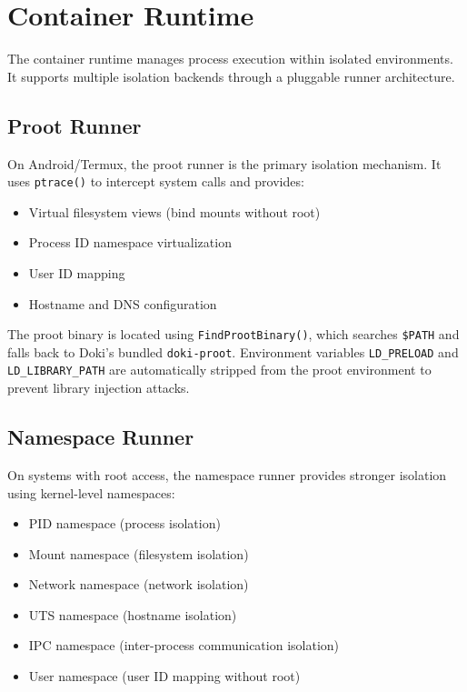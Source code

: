 \section{Container Runtime}
\label{sec:container-runtime}

The container runtime manages process execution within isolated
environments. It supports multiple isolation backends through a
pluggable runner architecture.

\subsection{Proot Runner}
\label{sec:proot-runner}

On Android/Termux, the proot runner is the primary isolation mechanism.
It uses \texttt{ptrace()} to intercept system calls and provides:

\begin{itemize}[leftmargin=*, itemsep=3pt]
  \item Virtual filesystem views (bind mounts without root)
  \item Process ID namespace virtualization
  \item User ID mapping
  \item Hostname and DNS configuration
\end{itemize}

The proot binary is located using \texttt{FindProotBinary()}, which
searches \texttt{\$PATH} and falls back to Doki's bundled
\texttt{doki-proot}. Environment variables \texttt{LD\_PRELOAD} and
\texttt{LD\_LIBRARY\_PATH} are automatically stripped from the proot
environment to prevent library injection attacks.

\subsection{Namespace Runner}
\label{sec:namespace-runner}

On systems with root access, the namespace runner provides stronger
isolation using kernel-level namespaces:

\begin{itemize}[leftmargin=*, itemsep=3pt]
  \item PID namespace (process isolation)
  \item Mount namespace (filesystem isolation)
  \item Network namespace (network isolation)
  \item UTS namespace (hostname isolation)
  \item IPC namespace (inter-process communication isolation)
  \item User namespace (user ID mapping without root)
\end{itemize}

